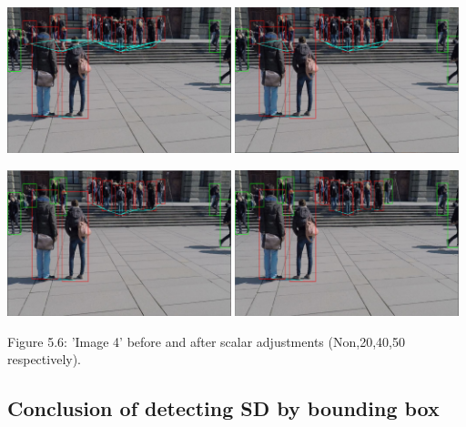 \documentclass[12pt]{report}
\begin{document}
\begin{center}
	\includegraphics[width=65mm]{./images/appendix/BeforeThresholdScale.JPG}
	\includegraphics[width=65mm]{./images/appendix/AfterThresholdScale.JPG}
	
	\includegraphics[width=65mm]{./images/appendix/AfterThresholdScale40.JPG}
	\includegraphics[width=65mm]{./images/appendix/AfterThresholdScale50.JPG}
	
	{\footnotesize Figure 5.6: 'Image 4' before and after scalar adjustments (Non,20,40,50 respectively).}
\end{center}

\subsection{Conclusion of detecting SD by bounding box}
\end{document}
